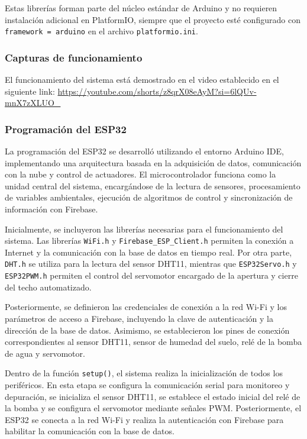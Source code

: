 \documentclass[conference]{IEEEtran}
\begin{document}
Estas librerías forman parte del núcleo estándar de Arduino y no requieren instalación adicional en PlatformIO, 
siempre que el proyecto esté configurado con \texttt{framework = arduino} en el archivo \texttt{platformio.ini}.
\subsubsection{Capturas de funcionamiento}
El funcionamiento del sistema está demostrado en el video establecido en el siguiente link:
\url{https://youtube.com/shorts/z8qrX08eAyM?si=6lQUv-mnX7zXLUO_}
\subsubsection{Programación del ESP32}
La programación del ESP32 se desarrolló utilizando el entorno Arduino IDE, implementando una arquitectura basada en la adquisición de datos, comunicación con la nube y control de actuadores. El microcontrolador funciona como la unidad central del sistema, encargándose de la lectura de sensores, procesamiento de variables ambientales, ejecución de algoritmos de control y sincronización de información con Firebase.

Inicialmente, se incluyeron las librerías necesarias para el funcionamiento del sistema. Las librerías \texttt{WiFi.h} y \texttt{Firebase\_ESP\_Client.h} permiten la conexión a Internet y la comunicación con la base de datos en tiempo real. Por otra parte, \texttt{DHT.h} se utiliza para la lectura del sensor DHT11, mientras que \texttt{ESP32Servo.h} y \texttt{ESP32PWM.h} permiten el control del servomotor encargado de la apertura y cierre del techo automatizado.

Posteriormente, se definieron las credenciales de conexión a la red Wi-Fi y los parámetros de acceso a Firebase, incluyendo la clave de autenticación y la dirección de la base de datos. Asimismo, se establecieron los pines de conexión correspondientes al sensor DHT11, sensor de humedad del suelo, relé de la bomba de agua y servomotor.

Dentro de la función \texttt{setup()}, el sistema realiza la inicialización de todos los periféricos. En esta etapa se configura la comunicación serial para monitoreo y depuración, se inicializa el sensor DHT11, se establece el estado inicial del relé de la bomba y se configura el servomotor mediante señales PWM. Posteriormente, el ESP32 se conecta a la red Wi-Fi y realiza la autenticación con Firebase para habilitar la comunicación con la base de datos.
\end{document}
